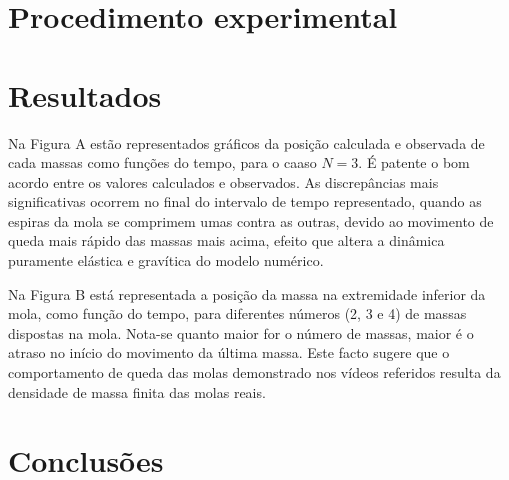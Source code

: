 \documentclass{article}
\begin{document}
\section*{Procedimento experimental}

\section*{Resultados}
Na Figura A estão representados gráficos da posição calculada e observada de
cada massas como funções do tempo, para o caaso $N=3$. É patente o bom acordo
entre os valores calculados e observados. As discrepâncias mais significativas
ocorrem no final do intervalo de tempo representado, quando as espiras da mola
se comprimem umas contra as outras, devido ao movimento de queda mais rápido das
massas mais acima, efeito que altera a dinâmica puramente elástica e gravítica
do modelo numérico.

Na Figura B está representada a posição da massa na extremidade inferior da
mola, como função do tempo, para diferentes números (2, 3 e 4) de massas
dispostas na mola. Nota-se quanto maior for o número de massas, maior é o
atraso no início do movimento da última massa. Este facto sugere que o
comportamento de queda das molas demonstrado nos vídeos referidos resulta da
densidade de massa finita das molas reais.

\section*{Conclusões}
\end{document}
